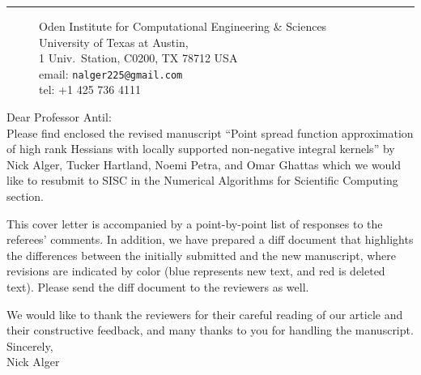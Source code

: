 \documentclass[11pt]{article}
\begin{document}
\pagestyle{empty}
 \begin{figure}
 \begin{minipage}{.5\columnwidth}
 \end{minipage}\hfill
 \begin{minipage}[b]{.48\columnwidth}
\flushright
 \vspace{-0.9cm}
 \end{minipage}
 \end{figure}
 \noindent\rule{\columnwidth}{.5pt}\vspace{-2ex}
 \begin{figure}[h]
 \begin{minipage}{.2\columnwidth}
 \end{minipage}\hfill
 \begin{minipage}{.78\columnwidth}
 \flushright\vspace{-2ex}
 {\noindent Oden Institute for Computational Engineering \& Sciences \\ 
 University of Texas at Austin, \\ 
 1 Univ.\ Station, C0200,
 TX 78712 USA \\
 email: {\tt nalger225@gmail.com}\\
 tel: +1 425 736 4111}\\
 \end{minipage}
 \end{figure}
\phantom{adafdsf}
\vspace{3ex}

\bigskip 

\noindent Dear Professor Antil:\\[2ex]

Please find enclosed the revised manuscript ``Point spread function
approximation of high rank Hessians with locally supported
non-negative integral kernels'' by Nick Alger, Tucker Hartland, Noemi
Petra, and Omar Ghattas which we would like to resubmit to SISC in the
Numerical Algorithms for Scientific Computing section.

%
This cover letter is accompanied by a point-by-point list of responses
to the referees' comments. In addition, we have prepared a diff
document that highlights the differences between the initially
submitted and the new manuscript, where revisions are indicated by
color (blue represents new text, and red is deleted text). Please send
the diff document to the reviewers as well.

We would like to thank the reviewers for their careful reading of our article 
and their constructive feedback, and many thanks to you for handling the
manuscript.\\[3ex]


\noindent Sincerely,\\[5ex]
\phantom{dd}\hspace{2cm} Nick Alger
\end{document}
